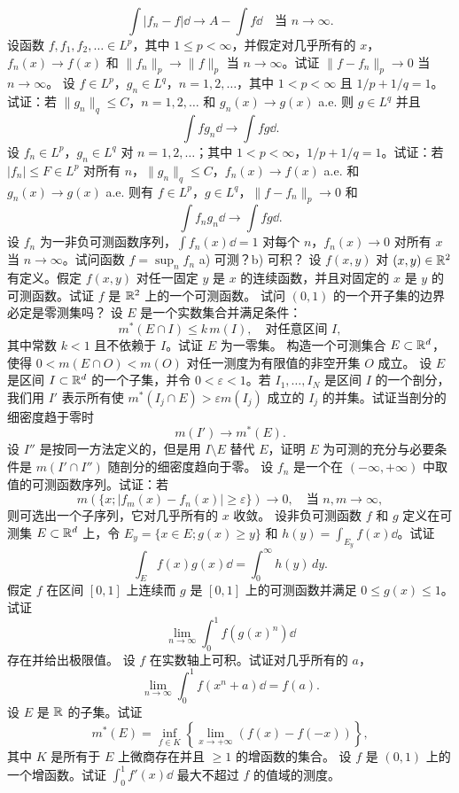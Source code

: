 \begin{enumerate}[label=\textbf{\arabic*.},itemsep=.8em]
\[\int|f_n-f|\dd\to A-\int f\dd\quad\text{当 }n\to\infty.\]
 设函数 $f,f_1,f_2,\ldots\in L^p$，其中 $1\le p<\infty$，并假定对几乎所有的 $x$，$f_n(x)\to f(x)$ 和 $\|f_n\|_p\to\|f\|_p$ 当 $n\to\infty$。试证 $\|f-f_n\|_p\to0$ 当 $n\to\infty$。
 设 $f\in L^p$，$g_n\in L^q$，$n=1,2,\ldots$，其中 $1<p<\infty$ 且 $1/p+1/q=1$。试证：若 $\|g_n\|_q\le C$，$n=1,2,\ldots$ 和 $g_n(x)\to g(x)$ a.e. 则 $g\in L^q$ 并且
\[\int fg_n\dd\to\int fg\dd.\]
 设 $f_n\in L^p$，$g_n\in L^q$ 对 $n=1,2,\ldots$；其中 $1<p<\infty$，$1/p+1/q=1$。试证：若 $|f_n|\le F\in L^p$ 对所有 $n$，$\|g_n\|_q\le C$，$f_n(x)\to f(x)$ a.e. 和 $g_n(x)\to g(x)$ a.e. 则有 $f\in L^p$，$g\in L^q$，$\|f-f_n\|_p\to0$ 和
\[\int f_ng_n\dd\to\int fg\dd.\]
 设 $f_n$ 为一非负可测函数序列，$\int f_n(x)\dd=1$ 对每个 $n$，$f_n(x)\to0$ 对所有 $x$ 当 $n\to\infty$。试问函数 $f=\sup_n f_n$ a) 可测？b) 可积？
 设 $f(x,y)$ 对 $(x,y)\in\mathbb R^2$ 有定义。假定 $f(x,y)$ 对任一固定 $y$
是 $x$ 的连续函数，并且对固定的 $x$ 是 $y$ 的可测函数。试证 $f$ 是 $\mathbb R^2$ 上的一个可测函数。
 试问 $(0,1)$ 的一个开子集的边界必定是零测集吗？
 设 $E$ 是一个实数集合并满足条件：
\[m^*(E\cap I)\le k\,m(I),\quad\text{对任意区间 }I,\]
其中常数 $k<1$ 且不依赖于 $I$。试证 $E$ 为一零集。
 构造一个可测集合 $E\subset\mathbb R^d$，使得 $0<m(E\cap O)<m(O)$ 对任一测度为有限值的非空开集 $O$ 成立。
 设 $E$ 是区间 $I\subset\mathbb R^d$ 的一个子集，并令 $0<\varepsilon<1$。若 $I_1,\ldots,I_N$ 是区间 $I$ 的一个剖分，我们用 $I'$ 表示所有使 $m^*(I_j\cap E)>\varepsilon m(I_j)$ 成立的 $I_j$ 的并集。试证当剖分的细密度趋于零时
\[m(I')\to m^*(E).\]
设 $I''$ 是按同一方法定义的，但是用 $I\setminus E$ 替代 $E$，证明 $E$ 为可测的充分与必要条件是 $m(I'\cap I'')$ 随剖分的细密度趋向于零。
 设 $f_n$ 是一个在 $(-\infty,+\infty)$ 中取值的可测函数序列。试证：若
\[m(\{x;|f_m(x)-f_n(x)|\ge\varepsilon\})\to0,\quad\text{当 }n,m\to\infty,\]
则可选出一个子序列，它对几乎所有的 $x$ 收敛。
 设非负可测函数 $f$ 和 $g$ 定义在可测集 $E\subset\mathbb R^d$ 上，令 $E_y=\{x\in E;g(x)\ge y\}$ 和 $h(y)=\int_{E_y}f(x)\dd$。试证
\[\int_E f(x)g(x)\dd=\int_0^\infty h(y)\,dy.\]
 假定 $f$ 在区间 $[0,1]$ 上连续而 $g$ 是 $[0,1]$ 上的可测函数并满足 $0\le g(x)\le1$。试证
\[\lim_{n\to\infty}\int_0^1 f(g(x)^n)\dd\]
存在并给出极限值。
 设 $f$ 在实数轴上可积。试证对几乎所有的 $a$，
\[\lim_{n\to\infty}\int_0^1 f(x^n+a)\dd=f(a).\]
 设 $E$ 是 $\mathbb R$ 的子集。试证
\[m^*(E)=\inf_{f\in K}\left\{\lim_{x\to+\infty}(f(x)-f(-x))\right\},\]
其中 $K$ 是所有于 $E$ 上微商存在并且 $\ge1$ 的增函数的集合。
 设 $f$ 是 $(0,1)$ 上的一个增函数。试证 $\int_0^1 f'(x)\dd$ 最大不超过 $f$ 的值域的测度。
\end{enumerate}
